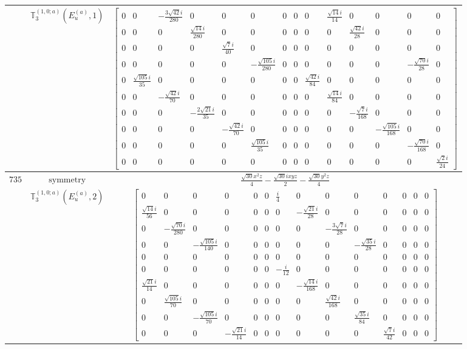 \documentclass[fleqn,8pt,landscape]{jsarticle}
\begin{document}
\begin{longtable}{ccc}
$  $ & $ \mathbb{T}_{3}^{(1,0;a)}(E_{u}^{(a)},1) $ & $ \begin{bmatrix} 0 & 0 & - \frac{3 \sqrt{42} i}{280} & 0 & 0 & 0 & 0 & 0 & 0 & \frac{\sqrt{14} i}{14} & 0 & 0 & 0 & 0 \\ 0 & 0 & 0 & \frac{\sqrt{14} i}{280} & 0 & 0 & 0 & 0 & 0 & 0 & \frac{\sqrt{42} i}{28} & 0 & 0 & 0 \\ 0 & 0 & 0 & 0 & \frac{\sqrt{7} i}{40} & 0 & 0 & 0 & 0 & 0 & 0 & 0 & 0 & 0 \\ 0 & 0 & 0 & 0 & 0 & - \frac{\sqrt{105} i}{280} & 0 & 0 & 0 & 0 & 0 & 0 & - \frac{\sqrt{70} i}{28} & 0 \\ 0 & \frac{\sqrt{105} i}{35} & 0 & 0 & 0 & 0 & 0 & 0 & \frac{\sqrt{42} i}{84} & 0 & 0 & 0 & 0 & 0 \\ 0 & 0 & - \frac{\sqrt{42} i}{70} & 0 & 0 & 0 & 0 & 0 & 0 & \frac{\sqrt{14} i}{84} & 0 & 0 & 0 & 0 \\ 0 & 0 & 0 & - \frac{2 \sqrt{21} i}{35} & 0 & 0 & 0 & 0 & 0 & 0 & - \frac{\sqrt{7} i}{168} & 0 & 0 & 0 \\ 0 & 0 & 0 & 0 & - \frac{\sqrt{42} i}{70} & 0 & 0 & 0 & 0 & 0 & 0 & - \frac{\sqrt{105} i}{168} & 0 & 0 \\ 0 & 0 & 0 & 0 & 0 & \frac{\sqrt{105} i}{35} & 0 & 0 & 0 & 0 & 0 & 0 & - \frac{\sqrt{70} i}{168} & 0 \\ 0 & 0 & 0 & 0 & 0 & 0 & 0 & 0 & 0 & 0 & 0 & 0 & 0 & \frac{\sqrt{2} i}{24} \end{bmatrix} $ \\ \hline
$ 735 $ & $ \text{symmetry} $ & $ \frac{\sqrt{30} x^{2} z}{4} - \frac{\sqrt{30} i x y z}{2} - \frac{\sqrt{30} y^{2} z}{4} $ \\
$  $ & $ \mathbb{T}_{3}^{(1,0;a)}(E_{u}^{(a)},2) $ & $ \begin{bmatrix} 0 & 0 & 0 & 0 & 0 & 0 & \frac{i}{4} & 0 & 0 & 0 & 0 & 0 & 0 & 0 \\ \frac{\sqrt{14} i}{56} & 0 & 0 & 0 & 0 & 0 & 0 & - \frac{\sqrt{21} i}{28} & 0 & 0 & 0 & 0 & 0 & 0 \\ 0 & - \frac{\sqrt{70} i}{280} & 0 & 0 & 0 & 0 & 0 & 0 & - \frac{3 \sqrt{7} i}{28} & 0 & 0 & 0 & 0 & 0 \\ 0 & 0 & - \frac{\sqrt{105} i}{140} & 0 & 0 & 0 & 0 & 0 & 0 & - \frac{\sqrt{35} i}{28} & 0 & 0 & 0 & 0 \\ 0 & 0 & 0 & 0 & 0 & 0 & 0 & 0 & 0 & 0 & 0 & 0 & 0 & 0 \\ 0 & 0 & 0 & 0 & 0 & 0 & - \frac{i}{12} & 0 & 0 & 0 & 0 & 0 & 0 & 0 \\ \frac{\sqrt{21} i}{14} & 0 & 0 & 0 & 0 & 0 & 0 & - \frac{\sqrt{14} i}{168} & 0 & 0 & 0 & 0 & 0 & 0 \\ 0 & \frac{\sqrt{105} i}{70} & 0 & 0 & 0 & 0 & 0 & 0 & \frac{\sqrt{42} i}{168} & 0 & 0 & 0 & 0 & 0 \\ 0 & 0 & - \frac{\sqrt{105} i}{70} & 0 & 0 & 0 & 0 & 0 & 0 & \frac{\sqrt{35} i}{84} & 0 & 0 & 0 & 0 \\ 0 & 0 & 0 & - \frac{\sqrt{21} i}{14} & 0 & 0 & 0 & 0 & 0 & 0 & \frac{\sqrt{7} i}{42} & 0 & 0 & 0 \end{bmatrix} $ \\ \hline

\end{longtable}
\end{document}
